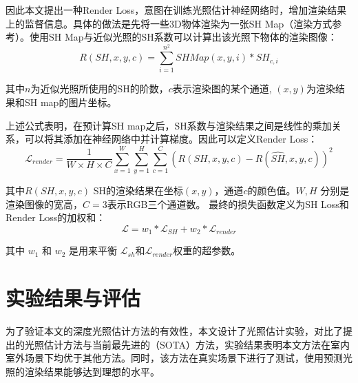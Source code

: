 因此本文提出一种Render Loss，意图在训练光照估计神经网络时，增加渲染结果上的监督信息。具体的做法是先将一些3D物体渲染为一张SH Map（渲染方式参考\cite{green2003spherical}）。使用SH Map与近似光照的SH系数可以计算出该光照下物体的渲染图像：
\begin{equation}
    R(SH, x, y, c) = \sum^{n^2}_{i=1}SHMap(x,y,i)*SH_{c,i}
\end{equation}

其中$n$为近似光照所使用的SH的阶数，$c$表示渲染图的某个通道, $(x, y)$为渲染结果和SH map的图片坐标。

上述公式表明，在预计算SH map之后，SH系数与渲染结果之间是线性的乘加关系，可以将其添加在神经网络中并计算梯度。因此可以定义Render Loss：
\begin{equation}
    \label{eq:render-loss}
    \mathcal{L}_{render} = \frac{1}{W\times H\times C} \sum_{x=1}^{W}\sum_{y=1}^{H}\sum_{c=1}^{C}(R(SH,x,y,c)-R(\hat{SH},x,y,c))^{2}
\end{equation}

其中$R(SH,x,y,c)$ SH的渲染结果在坐标$(x,y)$，通道$c$的颜色值。$W, H$ 分别是渲染图像的宽高，$C=3$表示RGB三个通道数。
最终的损失函数定义为SH Loss和Render Loss的加权和：
\begin{equation}
    \label{eq:loss-function}
    \mathcal{L} =w_{1}*\mathcal{L}_{SH}+w_{2}*\mathcal{L}_{render}
\end{equation}

 其中 $w_1$ 和 $w_2$ 是用来平衡 $\mathcal{L}_{sh}$和$\mathcal{L}_{render}$权重的超参数。
\section{实验结果与评估}\label{sec:experiment}
为了验证本文的深度光照估计方法的有效性，本文设计了光照估计实验，对比了提出的光照估计方法与当前最先进的（SOTA）方法，实验结果表明本文方法在室内室外场景下均优于其他方法。同时，该方法在真实场景下进行了测试，使用预测光照的渲染结果能够达到理想的水平。
